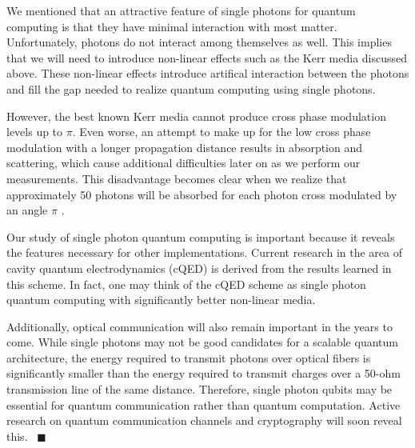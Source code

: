 We mentioned that an attractive feature of single photons for quantum computing is that they have minimal interaction with most matter. Unfortunately, photons do not interact among themselves as well. This implies that we will need to introduce non-linear effects such as the Kerr media discussed above. These non-linear effects introduce artifical interaction between the photons and fill the gap needed to realize quantum computing using single photons. 

However, the best known Kerr media cannot produce cross phase modulation levels up to $\pi$. Even worse, an attempt to make up for the low cross phase modulation with a longer propagation distance results in absorption and scattering, which cause additional difficulties later on as we perform our measurements. This disadvantage becomes clear when we realize that approximately 50 photons will be absorbed for each photon cross modulated by an angle $\pi$ \cite{nielsen2000}. 

Our study of single photon quantum computing is important because it reveals the features necessary for other implementations. Current research in the area of cavity quantum electrodynamics (cQED) is derived from the results learned in this scheme. In fact, one may think of the cQED scheme as single photon quantum computing with significantly better non-linear media.

Additionally, optical communication will also remain important in the years to come. While single photons may not be good candidates for a scalable quantum architecture, the energy required to transmit photons over optical fibers is significantly smaller than the energy required to transmit charges over a 50-ohm transmission line of the same distance. Therefore, single photon qubits may be essential for quantum communication rather than quantum computation. Active research on quantum communication channels and cryptography will soon reveal this.
~\hfill$\blacksquare$
